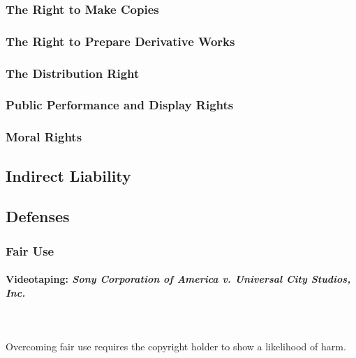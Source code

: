 
\subsubsection{The Right to Make Copies}


\subsubsection{The Right to Prepare Derivative Works}


\subsubsection{The Distribution Right}


\subsubsection{Public Performance and Display Rights}


\subsubsection{Moral Rights}


\subsection{Indirect Liability}


\subsection{Defenses}


\newpage %

\subsubsection{Fair Use}

\paragraph{Videotaping: \emph{Sony Corporation of America v. Universal City 
Studios, Inc.}}
~\\\\
Overcoming fair use requires the copyright holder to show a likelihood of 
harm.

